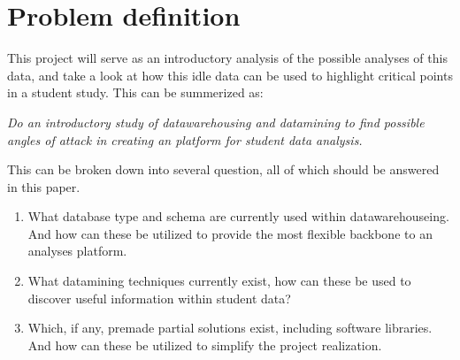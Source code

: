 \section{Problem definition}
	This project will serve as an introductory analysis of the possible analyses of this data, 
	and take a look at how this idle data can be used to highlight critical points in a student study.
	This can be summerized as:
	
		
	\textit{Do an introductory study of datawarehousing and datamining to find possible angles of attack in
	creating an platform for student data analysis. }\newline
	
	This can be broken down into several question, all of which should be answered in this paper.
	
	\begin{enumerate}
		\item What database type and schema are currently used within datawarehouseing. 
			And how can these be utilized to provide the most flexible backbone to an analyses platform.
		\item What datamining techniques currently exist, how can these be used to discover useful information
		within student data?
		\item Which, if any, premade partial solutions exist, including software libraries. 
		And how can these be utilized to simplify the project realization.
	\end{enumerate}